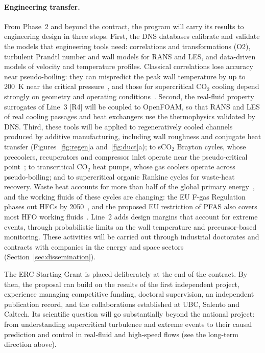 \documentclass[11pt]{article}
\begin{document}
\paragraph{Engineering transfer.} From Phase~2 and beyond the contract, the program will carry its
results to engineering design in three steps. First, the DNS databases calibrate and validate the
models that engineering tools need: correlations and transformations (O2), turbulent Prandtl number
and wall models for RANS and LES, and data-driven models of velocity and temperature profiles.
Classical correlations lose accuracy near pseudo-boiling: they can mispredict the peak wall
temperature by up to 200~K near the critical pressure~\cite{Nasuti2021}, and those for
supercritical CO$_2$ cooling depend strongly on geometry and operating
conditions~\cite{Pitla1998}. Second, the real-fluid property surrogates of Line~3 [R4] will be
coupled to OpenFOAM, so that RANS and LES of real cooling passages and heat exchangers use the
thermophysics validated by DNS. Third, these tools will be applied to regeneratively cooled channels
produced by additive manufacturing, including wall roughness and conjugate heat transfer
(Figures~\ref{fig:regen}a and~\ref{fig:duct}a); to sCO$_2$ Brayton cycles, whose precoolers,
recuperators and compressor inlet operate near the pseudo-critical point~\cite{Ahn2015}; to
transcritical CO$_2$ heat pumps, whose gas coolers operate across pseudo-boiling; and to
supercritical organic Rankine cycles for waste-heat recovery. Waste heat accounts for more than half
of the global primary energy~\cite{Markides2025}, and the working fluids of these cycles are changing:
the EU F-gas Regulation phases out HFCs by 2050~\cite{FGas2024}, and the proposed EU restriction of
PFAS also covers most HFO working fluids~\cite{ECHA2025}. Line~2 adds design margins that account for
extreme events, through probabilistic limits on the wall temperature and precursor-based monitoring.
These activities will be carried out through industrial doctorates and contracts with companies in
the energy and space sectors (Section~\ref{sec:dissemination}).

The ERC Starting Grant is placed deliberately at the end of the contract. By then, the
proposal can build on the results of the first independent project, experience managing
competitive funding, doctoral supervision, an independent publication record, and the
collaborations established at UBC, Salento and Caltech. Its scientific question
will go substantially beyond the national project: from understanding supercritical turbulence
and extreme events to their causal prediction and control in real-fluid and high-speed flows
(see the long-term direction above).
\end{document}

